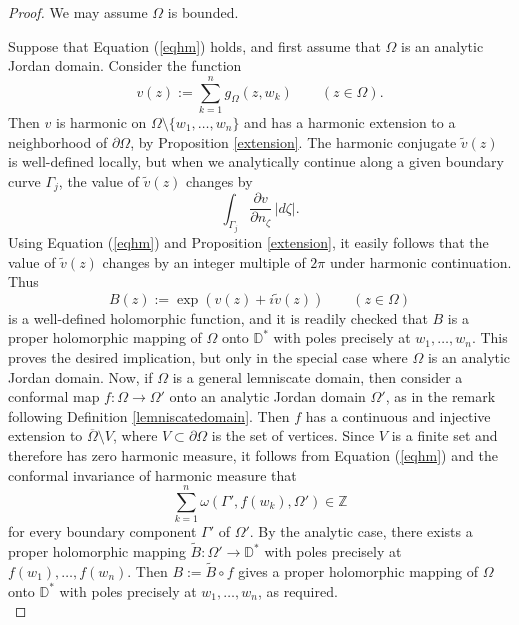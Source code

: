 \documentclass[10pt,a4paper]{amsart}
\newcommand{\mD}{\mathbb{D}}
\newcommand{\mZ}{\mathbb{Z}}
\renewcommand {\tilde} {\widetilde}
\begin{document}
\begin{proof}
We may assume $\Omega$ is bounded.

Suppose that Equation (\ref{eqhm}) holds, and first assume that $\Omega$ is an analytic Jordan domain. Consider the function
$$
v(z):=\sum_{k=1}^n g_{\Omega}(z,w_k) \qquad (z \in \Omega).
$$
Then $v$ is harmonic on $\Omega \setminus \{w_1, \dots, w_n\}$ and has a harmonic extension to a neighborhood of $\partial \Omega$, by Proposition \ref{extension}. The harmonic conjugate $\tilde{v}(z)$ is well-defined locally, but when we analytically continue along a given boundary curve $\Gamma_j$, the value of $\tilde{v}(z)$ changes by
$$
\int_{\Gamma_j} \frac{\partial v}{\partial n_\zeta} \, |d\zeta|.
$$
Using Equation (\ref{eqhm}) and Proposition \ref{extension}, it easily follows that the value of $\tilde{v}(z)$ changes by an integer multiple of $2\pi$ under harmonic continuation. Thus
$$
B(z):=\exp{\left(v(z) + i \tilde{v}(z)\right)} \qquad (z \in \Omega)
$$
is a well-defined holomorphic function, and it is readily checked that $B$ is a proper holomorphic mapping of $\Omega$ onto $\mD^*$ with poles precisely at $w_1, \dots, w_n$. This proves the desired implication, but only in the special case where $\Omega$ is an analytic Jordan domain. Now, if $\Omega$ is a general lemniscate domain, then consider a conformal map $f:\Omega \to \Omega'$ onto an analytic Jordan domain $\Omega'$, as in the remark following Definition \ref{lemniscatedomain}. Then $f$ has a continuous and injective extension to $\overline{\Omega} \setminus V$, where $V \subset \partial \Omega$ is the set of vertices. Since $V$ is a finite set and therefore has zero harmonic measure, it follows from Equation (\ref{eqhm}) and the conformal invariance of harmonic measure that
$$
\sum_{k=1}^n \omega(\Gamma', f(w_k), \Omega') \in \mZ
$$
for every boundary component $\Gamma'$ of $\Omega'$. By the analytic case, there exists a proper holomorphic mapping $\tilde{B}:\Omega' \to \mD^*$ with poles precisely at $f(w_1), \dots, f(w_n)$. Then $B:=\tilde{B} \circ f$ gives a proper holomorphic mapping of $\Omega$ onto $\mD^*$ with poles precisely at $w_1, \dots, w_n$, as required.
\\


\end{proof}
\end{document}
